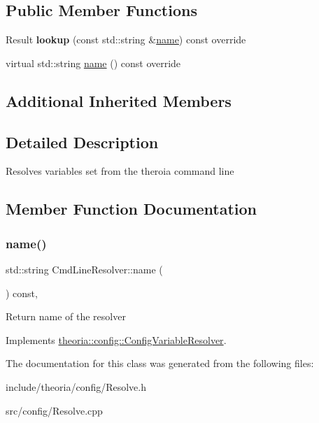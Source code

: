 \subsection*{Public Member Functions}
\begin{DoxyCompactItemize}
\item 
\mbox{\label{classtheoria_1_1config_1_1CmdLineResolver_a6de270bd5855361b368cc082df53a527}} 
Result {\bfseries lookup} (const std\+::string \&\hyperlink{classtheoria_1_1config_1_1CmdLineResolver_ab42f0d86e62e985ee0bc94947df46a74}{name}) const override
\item 
virtual std\+::string \hyperlink{classtheoria_1_1config_1_1CmdLineResolver_ab42f0d86e62e985ee0bc94947df46a74}{name} () const override
\end{DoxyCompactItemize}
\subsection*{Additional Inherited Members}


\subsection{Detailed Description}
Resolves variables set from the theroia command line 

\subsection{Member Function Documentation}
\mbox{\label{classtheoria_1_1config_1_1CmdLineResolver_ab42f0d86e62e985ee0bc94947df46a74}} 
\subsubsection{\texorpdfstring{name()}{name()}}
{\footnotesize\ttfamily std\+::string Cmd\+Line\+Resolver\+::name (\begin{DoxyParamCaption}{ }\end{DoxyParamCaption}) const\hspace{0.3cm}{\ttfamily [override]}, {\ttfamily [virtual]}}

Return name of the resolver 

Implements \hyperlink{classtheoria_1_1config_1_1ConfigVariableResolver_a026bda729faf988eaef334a45ec92303}{theoria\+::config\+::\+Config\+Variable\+Resolver}.



The documentation for this class was generated from the following files\+:\begin{DoxyCompactItemize}
\item 
include/theoria/config/Resolve.\+h\item 
src/config/Resolve.\+cpp\end{DoxyCompactItemize}
